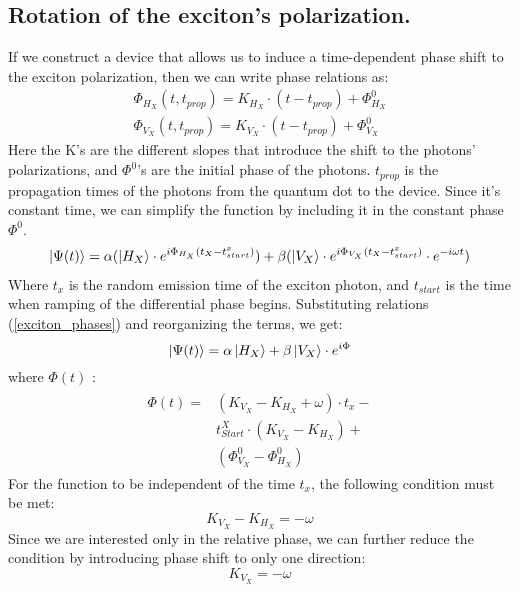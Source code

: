 \subsection{Rotation of the exciton's polarization.}
If we construct a device that allows us to induce a time-dependent phase shift to the exciton polarization, then we can write phase relations as:
\begin{equation} \label{exciton_phases}
\begin{aligned} 
        &\Phi_{H_{X}}{(t,t_{prop})} = K_{H_{X}}\cdot(t-t_{prop}) + \Phi^0_{H_{X}} &\\
		&\Phi_{V_{X}}{(t,t_{prop})} = K_{V_{X}}\cdot(t-t_{prop}) + \Phi^0_{V_{X}} 
\end{aligned}
\end{equation}
Here the  K's are the different slopes that introduce the shift to the photons' polarizations, and  $\Phi^0$'s are the initial phase of the photons. $t_{prop}$ is the propagation times of the photons from the quantum dot to the device. Since it's constant time, we can simplify the function by including it in the constant phase $\Phi^0$.
\begin{equation}
\begin{split}
		\ket{\Psi(t)}= \alpha( \ket{H_{X}}\cdot e^{i\Phi_{H_{X}}(t_{X}-t^{x}_{start})})+
		\beta (\ket{V_{X}}\cdot e^{i\Phi_{V_{X}}(t_{X}-t^{x}_{start})}\cdot e^{-i\omega t})
  \end{split}
\end{equation} 
Where $t_x$ is the random emission time of the exciton photon, and $t_{start}$ is the time when ramping of the differential phase begins. Substituting relations (\ref{exciton_phases}) and reorganizing the terms, we get:
\begin{equation}
	\ket{\Psi(t)} = \alpha\ket{H_X}+\beta\ket{V_X}\cdot e^{i\Phi}
\end{equation}
where $\Phi(t)$ :
\begin{equation}
\begin{split}  
\begin{aligned} 
	\Phi(t) = &(K_{V_X}-K_{H_X} + \omega)\cdot t_x -\\
 &t^X_{Start} \cdot(K_{V_X}-K_{H_X})+\\
 &(\Phi^0_{V_{X}}-\Phi^0_{H_{X}})
 \end{aligned}
 \end{split}
\end{equation}
For the function to be independent of the time $t_x$, the following condition must be met:
\begin{equation}
K_{V_X}-K_{H_X} =-\omega 
\end{equation}
Since we are interested only in the relative phase, we can further reduce the condition by introducing phase shift to only one direction:
\begin{equation}
K_{V_X} =-\omega 
\end{equation}
